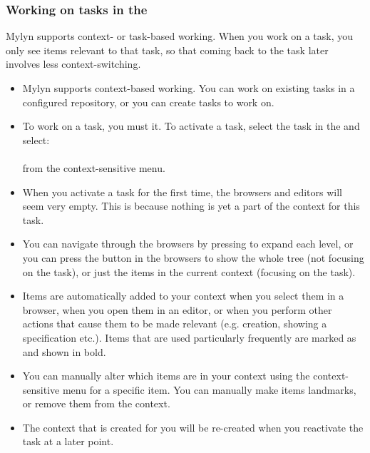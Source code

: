 \subsubsection{Working on tasks in the \ite{}}
\label{TasksActivateTask}
Mylyn supports context- or task-based working. When you work on a task, you only see items relevant to that task, so that coming back to the task later involves less context-switching. 
\begin{itemize}
\item Mylyn supports context-based working. You can work on existing tasks in a configured repository, or you can create tasks to work on.
\item To work on a task, you must  it. To activate a task, select the task in the  and select:\\ \\
from the context-sensitive menu. 
\item When you activate a task for the first time, the browsers and editors will seem very empty. This is because nothing is yet a part of the context for this task.
\item You can navigate through the browsers by pressing  to expand each level, or you can press the  button in the browsers to show the whole tree (not focusing on the task), or just the items in the current context (focusing on the task). 
\item Items are automatically added to your context when you select them in a browser, when you open them in an editor, or when you perform other actions that cause them to be made relevant (e.g. \gdcase{} creation, showing a \gdcase{} specification etc.). Items that are used particularly frequently are marked as  and shown in bold. 
\item You can manually alter which items are in your context using the context-sensitive menu for a specific item. You can manually make items landmarks, or remove them from the context. 
\item The context that is created for you will be re-created when you reactivate the task at a later point. 
\end{itemize}

